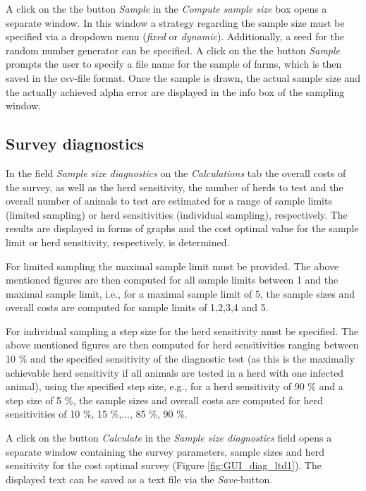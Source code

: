 \documentclass[nojss]{jss}
\begin{document}
A click on the the button \emph{Sample} in the \emph{Compute sample size} box opens a separate window. In this window a strategy regarding the sample size must be specified via a dropdown menu (\emph{fixed} or \emph{dynamic}). Additionally, a seed for the random number generator can be specified. A click on the the button \emph{Sample} prompts the user to specify a file name for the sample of farms, which is then saved in the csv-file format. Once the sample is drawn, the actual sample size and the actually achieved alpha error are displayed in the info box of the sampling window.


\subsection{Survey diagnostics}
\label{subsec:GUI_cost_analysis}

In the field \emph{Sample size diagnostics} on the \emph{Calculations} tab the overall costs of the survey, as well as the herd sensitivity, the number of herds to test and the overall number of animals to test are estimated for a range of sample limits (limited sampling) or herd sensitivities (individual sampling), respectively. The results are displayed in forms of graphs and the cost optimal value for the sample limit or herd sensitivity, respectively, is determined.

For limited sampling the maximal sample limit must be provided. The above mentioned figures are then computed for all sample limits between 1 and the maximal sample limit, i.e., for a maximal sample limit of 5, the sample sizes and overall costs are computed for sample limits of 1,2,3,4 and 5.

For individual sampling a step size for the herd sensitivity must be specified. The above mentioned figures are then computed for herd sensitivities ranging between 10 \% and the specified sensitivity of the diagnostic test (as this is the maximally achievable herd sensitivity if all animals are tested in a herd with one infected animal), using the specified step size, e.g., for a herd sensitivity of 90 \% and a step size of 5 \%, the sample sizes and overall costs are computed for herd sensitivities of 10 \%, 15 \%,$\ldots$, 85 \%, 90 \%.

A click on the button \emph{Calculate} in the \emph{Sample size diagnostics} field opens a separate window containing the survey parameters, sample sizes and herd sensitivity for the cost optimal survey (Figure \ref{fig:GUI_diag_ltd1}). The displayed text can be saved as a text file via the \emph{Save}-button.
\end{document}
